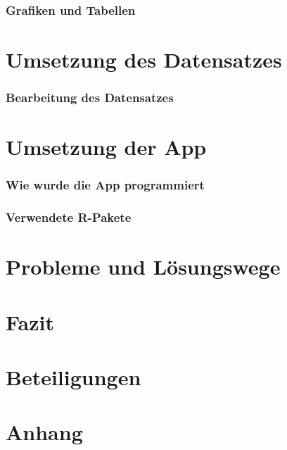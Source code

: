 \documentclass[12pt]{IEEEtran}
\begin{document}
\subsubsection{Grafiken und Tabellen}

\section{Umsetzung des Datensatzes}
\subsubsection{Bearbeitung des Datensatzes}


\section{Umsetzung der App}
\subsubsection{Wie wurde die App programmiert}
\subsubsection{Verwendete R-Pakete}

\section{Probleme und Lösungswege}
\section{Fazit}
\section{Beteiligungen}
\section{Anhang}
\twocolumn
\clearpage


	
\end{document}
